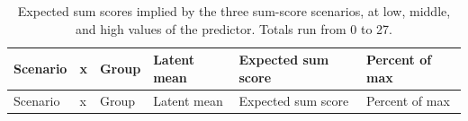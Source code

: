 \documentclass[
  man,
  floatsintext,
  longtable,
  nolmodern,
  notxfonts,
  notimes,
  colorlinks=true,linkcolor=blue,citecolor=blue,urlcolor=blue]{apa7}
\begin{document}
\begin{longtable}[]{@{}
  >{\raggedright\arraybackslash}p{}
  >{\raggedright\arraybackslash}p{}
  >{\raggedright\arraybackslash}p{}
  >{\raggedright\arraybackslash}p{}
  >{\raggedright\arraybackslash}p{}
  >{\raggedright\arraybackslash}p{}@{}}
\caption{Expected sum scores implied by the three sum-score scenarios,
at low, middle, and high values of the predictor. Totals run from 0 to
27.}\label{tbl-scenario-sum-scores}\tabularnewline
\toprule\noalign{}
\begin{minipage}[b]{\linewidth}\raggedright
Scenario
\end{minipage} & \begin{minipage}[b]{\linewidth}\raggedright
x
\end{minipage} & \begin{minipage}[b]{\linewidth}\raggedright
Group
\end{minipage} & \begin{minipage}[b]{\linewidth}\raggedright
Latent mean
\end{minipage} & \begin{minipage}[b]{\linewidth}\raggedright
Expected sum score
\end{minipage} & \begin{minipage}[b]{\linewidth}\raggedright
Percent of max
\end{minipage} \\
\midrule\noalign{}
\endfirsthead
\toprule\noalign{}
\begin{minipage}[b]{\linewidth}\raggedright
Scenario
\end{minipage} & \begin{minipage}[b]{\linewidth}\raggedright
x
\end{minipage} & \begin{minipage}[b]{\linewidth}\raggedright
Group
\end{minipage} & \begin{minipage}[b]{\linewidth}\raggedright
Latent mean
\end{minipage} & \begin{minipage}[b]{\linewidth}\raggedright
Expected sum score
\end{minipage} & \begin{minipage}[b]{\linewidth}\raggedright
Percent of max

\end{minipage}
\end{longtable}
\end{document}
